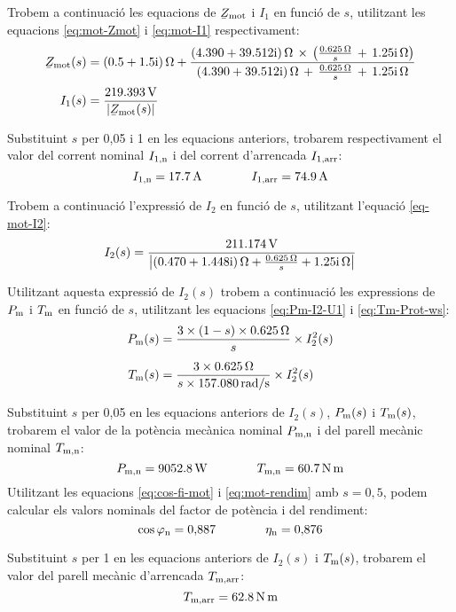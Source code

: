 \begin{exemple}
 Trobem a continuació les equacions de $\cmplx{Z}\ped{mot}$ i $I_1$ en funció de $s$, utilitzant les equacions \eqref{eq:mot-Zmot} i \eqref{eq:mot-I1} respectivament:
    \begin{align*}
		\cmplx{Z}\ped{mot}(s) &= \complexqty{0,5+j1,5}{\ohm} + \frac{\complexqty{4,390+j39,512}{\ohm}\,\times\,
	      \left(\tfrac{\qty{0,625}{\ohm}}{s}\, + \, \complexqty{j1,25}{\ohm}\right)}{\complexqty{4,390+j39,512}{\ohm}\,+\,
	   \tfrac{\qty{0,625}{\ohm}}{s}\, + \,\complexqty{j1,25}{\ohm}} \\[0.5ex]
   		I_1(s)  &= \frac{\qty{219,393}{V}}{|\cmplx{Z}\ped{mot}(s)|}  
	\end{align*} 
 
    Substituint $s$ per 0,05 i 1 en les equacions anteriors, trobarem respectivament el valor del corrent nominal $I_\mathrm{1,n}$ i del corrent d'arrencada $I_\mathrm{1,arr}$:
    \[
        I_\mathrm{1,n} = \qty{17,7}{A} \qquad\qquad
        I_\mathrm{1,arr} = \qty{74,9}{A}
    \]
    
    Trobem a continuació l'expressió de $I_2$ en funció de $s$, utilitzant l'equació \eqref{eq-mot-I2}:
    \[
        I_2(s) = \frac{\qty{211,174}{V}}{\left| \complexqty{0,470+j1,448}{\ohm} + \frac{\qty{0,625}{\ohm}}{s} + \complexqty{j1,25}{\ohm} \right|}
    \]

    Utilitzant aquesta expressió de $I_2(s)$ trobem a continuació les expressions de $P_\mathrm{m}$ i $T_\mathrm{m}$ en funció de $s$, utilitzant les equacions \eqref{eq:Pm-I2-U1} i \eqref{eq:Tm-Prot-ws}:
     \begin{align*}
        P_\mathrm{m}(s) &=\frac{ 3\times (1-s)\times \qty{0,625}{\ohm} }{s} \times  I_2^2(s) \\[1ex]
        T_\mathrm{m}(s)  &=  \frac{3\times \qty{0,625}{\ohm}}{s\times \qty{157,080}{rad/s}} \times  I_2^2(s)
    \end{align*}

     Substituint $s$ per 0,05  en les equacions anteriors de $I_2(s)$, $P_\mathrm{m}(s)$ i $T_\mathrm{m}(s)$, trobarem el valor de la potència mecànica nominal $P_\mathrm{m,n}$ i del parell mecànic nominal $T_\mathrm{m,n}$:
     \[
        P_\mathrm{m,n} = \qty{9052,8}{W} \qquad\qquad
         T_\mathrm{m,n} = \qty{60,7}{N.m} 
    \]   
    Utilitzant les equacions  \eqref{eq:cos-fi-mot} i \eqref{eq:mot-rendim} amb $s  = 0{,}5$, podem calcular els valors nominals del factor de potència i del rendiment:
    \[
    \cos\varphi_\mathrm{n} =  0{,}887 \qquad\qquad
    \eta_\mathrm{n} =  0{,}876
    \] 
    
    Substituint $s$ per 1   en les equacions anteriors de $I_2(s)$  i $T_\mathrm{m}(s)$, trobarem el valor del parell mecànic d'arrencada $T_\mathrm{m,arr}$:
	\[
		T_\mathrm{m,arr} = \qty{62,8}{N.m}
	\]


\end{exemple}
